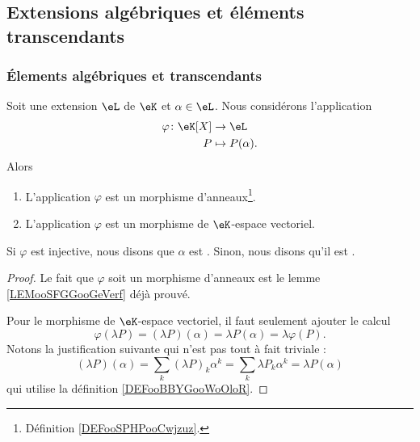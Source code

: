 \subsection{Extensions algébriques et éléments transcendants}

\subsubsection{Élements algébriques et transcendants}

\begin{lemmaDef} \label{LEMooLVPLooEkWYDN}
    Soit une extension \( \eL\) de \( \eK\) et \( \alpha\in \eL\). Nous considérons l'application
    \begin{equation}
        \begin{aligned}
            \varphi\colon \eK[X]&\to \eL \\
            P&\mapsto P(\alpha).
        \end{aligned}
    \end{equation}
    Alors
    \begin{enumerate}
        \item
            L'application \( \varphi\) est un morphisme d'anneaux\footnote{Définition \ref{DEFooSPHPooCwjzuz}.}.
        \item
            L'application \( \varphi\) est un morphisme de \( \eK\)-espace vectoriel.
    \end{enumerate}
    Si \( \varphi\) est injective, nous disons que \( \alpha\) est . Sinon, nous disons qu'il est .
\end{lemmaDef}

\begin{proof}
    Le fait que \( \varphi\) soit un morphisme d'anneaux est le lemme \ref{LEMooSFGGooGeVerf} déjà prouvé.

    Pour le morphisme de \( \eK\)-espace vectoriel, il faut seulement ajouter le calcul
    \begin{equation}
        \varphi(\lambda P)=(\lambda P)(\alpha)=\lambda P(\alpha)=\lambda \varphi(P).
    \end{equation}
    Notons la justification suivante qui n'est pas tout à fait triviale :
    \begin{equation}
        (\lambda P)(\alpha)=\sum_k(\lambda P)_k\alpha^k=\sum_k\lambda P_k\alpha^k=\lambda P(\alpha)
    \end{equation}
    qui utilise la définition \ref{DEFooBBYGooWoOloR}.
\end{proof}

